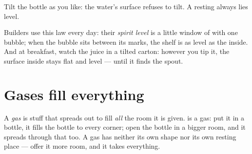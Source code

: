 \begin{omfigure}

{\small Tilt the bottle as you like: the water's surface refuses to
tilt. A resting  always lies level.}
\end{omfigure}

\begin{example}\label{ex:g3:solids-liquids-gases:level}
Builders use this law every day: their \emph{spirit level} is a
little window of  with one bubble; when the bubble sits
between its marks, the shelf is as level as the  inside. And
at breakfast, watch the juice in a tilted carton: however you tip
it, the surface inside stays flat and level --- until it finds the
spout.
\end{example}

\section{Gases fill everything}

\begin{definition}[Gas]\label{def:g3:solids-liquids-gases:gas}
A \emph{gas} is stuff that spreads out to fill \emph{all}
the room it is given.  is a gas: put it in a bottle, it fills the
bottle to every corner; open the bottle in a bigger room, and it
spreads through that too. A gas has neither its own shape nor its
own resting place --- offer it more room, and it takes everything.
\end{definition}

